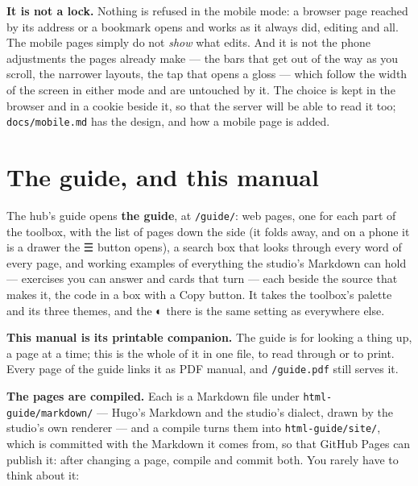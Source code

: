 \documentclass[11pt,oneside]{report}
\newcommand{\sym}[1]{{\symfont #1}}
\newcommand{\file}[1]{\texttt{#1}}
\newcommand{\menu}[1]{\textsf{#1}}
\begin{document}
\textbf{It is not a lock.} Nothing is refused in the mobile mode: a browser
page reached by its address or a bookmark opens and works as it always did,
editing and all. The mobile pages simply do not \emph{show} what edits. And
it is not the phone adjustments the pages already make --- the bars that get
out of the way as you scroll, the narrower layouts, the tap that opens a
gloss --- which follow the width of the screen in either mode and are
untouched by it. The choice is kept in the browser and in a cookie beside it,
so that the server will be able to read it too; \file{docs/mobile.md} has the
design, and how a mobile page is added.

\section{The guide, and this manual}
\label{sec:guidepages}

The hub's \menu{guide} opens \textbf{the guide}, at \texttt{/guide/}: web
pages, one for each part of the toolbox, with the list of pages down the side
(it folds away, and on a phone it is a drawer the \sym{☰} button opens), a
search box that looks through every word of every page, and working examples
of everything the studio's Markdown can hold --- exercises you can answer and
cards that turn --- each beside the source that makes it, the code in a box
with a \menu{Copy} button. It takes the toolbox's palette and its three
themes, and the \sym{◐} there is the same setting as everywhere else.

\textbf{This manual is its printable companion.} The guide is for looking a
thing up, a page at a time; this is the whole of it in one file, to read
through or to print. Every page of the guide links it as \menu{PDF manual},
and \texttt{/guide.pdf} still serves it.

\textbf{The pages are compiled.} Each is a Markdown file under
\file{html-guide/markdown/} --- Hugo's Markdown and the studio's dialect,
drawn by the studio's own renderer --- and a compile turns them into
\file{html-guide/site/}, which is committed with the Markdown it comes from,
so that GitHub Pages can publish it: after changing a page, compile and
commit both. You rarely have to think about it:
\end{document}
